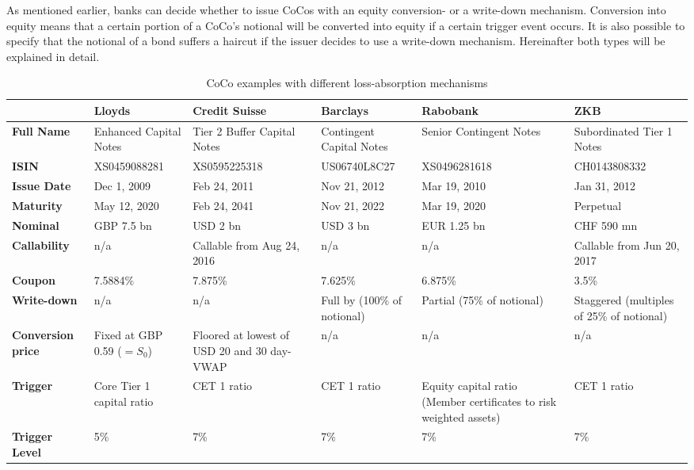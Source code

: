 As mentioned earlier, banks can decide whether to issue CoCos with an equity conversion- or a write-down mechanism. Conversion into equity means that a certain portion of a CoCo's notional will be converted into equity if a certain trigger event occurs. It is also possible to specify that the notional of a bond suffers a haircut if the issuer decides to use a write-down mechanism. Hereinafter both types will be explained in detail.

\begin{table}[H]
	\tiny
	\setlength{\extrarowheight}{2.5pt}
	\centering
	\begin{tabular}{p{1.5cm}p{2cm}p{2cm}p{2cm}p{2cm}p{2cm}}
		\toprule
			& \textbf{Lloyds} & \textbf{Credit Suisse} & \textbf{Barclays} & \textbf{Rabobank} & \textbf{ZKB} \\ 
		\midrule
			\textbf{Full Name} & Enhanced Capital Notes & Tier 2 Buffer Capital Notes & Contingent Capital Notes & Senior Contingent Notes & Subordinated Tier 1 Notes \\
			\textbf{ISIN} & XS0459088281 & XS0595225318 & US06740L8C27 & XS0496281618 & CH0143808332 \\
			\textbf{Issue Date} & Dec 1, 2009 & Feb 24, 2011 & Nov 21, 2012 & Mar 19, 2010 & Jan 31, 2012 \\ 
			\textbf{Maturity} & May 12, 2020 & Feb 24, 2041 & Nov 21, 2022 & Mar 19, 2020 & Perpetual \\ 
		\midrule
			\textbf{Nominal} & GBP 7.5 bn  & USD 2 bn & USD 3 bn & EUR 1.25 bn & CHF 590 mn\\
			\textbf{Callability} & n/a & Callable from Aug 24, 2016 & n/a & n/a & Callable from Jun 20, 2017 \\	
			\textbf{Coupon} & 7.5884\% & 7.875\% & 7.625\% & 6.875\% & 3.5\% \\
		\midrule
			\textbf{Write-down} & \cellcolor{blue!20} n/a & \cellcolor{blue!20} n/a & \cellcolor{green!20} Full by (100\% of notional) & \cellcolor{green!20} Partial (75\% of notional) & \cellcolor{green!20} Staggered (multiples of 25\% of notional) \\
			\textbf{Conversion price} & \cellcolor{green!20} Fixed at GBP 0.59 ($=S_0$) & \cellcolor{green!20}Floored at lowest of USD 20 and 30 day-VWAP & \cellcolor{blue!20} n/a & \cellcolor{blue!20} n/a & \cellcolor{blue!20} n/a \\
			\textbf{Trigger} & Core Tier 1 capital ratio & CET 1 ratio & CET 1 ratio & Equity capital ratio (Member certificates to risk weighted assets)& CET 1 ratio \\
			\textbf{Trigger Level} & 5\% & 7\% & 7\% & 7\% & 7\% \\
		\bottomrule
	\end{tabular}
	\caption[CoCo examples with different loss-absorption mechanisms]{CoCo examples with different loss-absorption mechanisms \citep{lloyds2009, creditsuisse2011, barclays2010, rabobank2010, zkv2013}}
	\label{tbl:examples}
\end{table}

